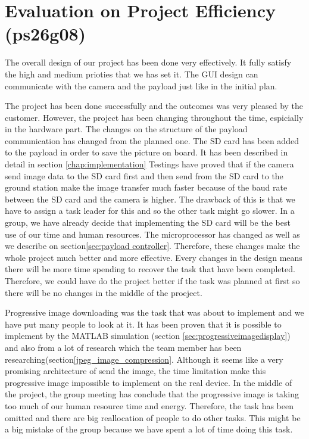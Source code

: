 \section{Evaluation on Project Efficiency (ps26g08)}

The overall design of our project has been done very effectively.
It fully satisfy the high and medium prioties that we has set it.
The GUI design can communicate with the camera and the payload just like in the initial plan.

The project has been done successfully and the outcomes was very pleased by the customer.
However, the project has been changing throughout the time, espicially in the hardware part.
The changes on the structure of the payload communication has changed from the planned one.
The SD card has been added to the payload in order to save the picture on board.
It has been described in detail in section \ref{chap:implementation}
Testings have proved that if the camera send image data to the SD card first and then send from the SD card to the ground station make the image transfer much faster because of the baud rate between the SD card and the camera is higher.
The drawback of this is that we have to assign a task leader for this and so the other task might go slower.
In a group, we have already decide that implementing the SD card will be the best use of our time and human resources.
The microprocessor has changed as well as we describe on section\ref{sec:payload controller}.
Therefore, these changes make the whole project much better and more effective.
Every changes in the design means there will be more time spending to recover the task that have been completed. 
Therefore, we could have do the project better if the task was planned at first so there will be no changes in the middle of the proeject.

Progressive image downloading was the task that was about to implement and we have put many people to look at it. 
It has been proven that it is possible to implement by the MATLAB simulation (section \ref{sec:progressiveimagedisplay}) and also from a lot of research which the team member has been researching(section\ref{jpeg_image_compression}.
Although it seems like a very promising architecture of send the image, the time limitation make this progressive image impossible to implement on the real device.
In the middle of the project, the group meeting has conclude that the progressive image is taking too much of our human resource time and energy.
Therefore, the task has been omitted and there are big reallocation of people to do other tasks.
This might be a big mistake of the group because we have spent a lot of time doing this task.








